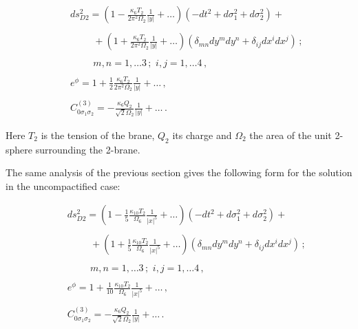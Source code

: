 \documentclass[12pt,a4paper]{article}
\begin{document}
\begin{eqnarray}
\label{D2}
&&ds_{D2}^2=(1-\frac{\kappa_6T_2}{2\pi^2\Omega_2}\frac{1}{|y|}
+\dots)(-dt^2+d\sigma_1^2+d\sigma_2^2)+\nonumber\\
&&\nonumber\\
&&\hspace{1cm}+(1+\frac{\kappa_6T_2}
{2\pi^2\Omega_2}\frac{1}{|y|}+\dots)\left(\delta_{mn}dy^m dy^n 
+\delta_{ij}dx^i dx^j\right) \, ;\nonumber\\
&&\nonumber\\
&&\hspace{1cm}m,n=1,\dots 3\, ;\,\, i,j=1,\dots 4\, ,\nonumber\\
& &\nonumber\\
&& e^\phi=1+\frac12\frac{\kappa_6 T_2}{2\pi^2\Omega_2}\frac{1}{|y|}
+\dots \, ,\nonumber\\
& &\nonumber\\
&& C^{(3)}_{0\sigma_1\sigma_2}=-\frac{\kappa_6 Q_2}
{\sqrt{2}\Omega_2}
\frac{1}{|y|}+\dots \, .
\end{eqnarray}

\noindent Here $T_2$ is the tension of the brane, $Q_2$ its charge and
$\Omega_2$ the area of the unit 2-sphere surrounding the 2-brane. 

The same analysis of the previous section gives the following form
for the solution in the uncompactified case:

\begin{eqnarray}
\label{D2unc}
&&ds_{D2}^2=(1-\frac15 \frac{\kappa_{10}T_2}{\Omega_6}\frac{1}{|x|^5}
+\dots)(-dt^2+d\sigma_1^2+d\sigma_2^2)+\nonumber\\
&&\nonumber\\
&&\hspace{1cm}+(1+\frac15 \frac{\kappa_{10}T_2}
{\Omega_6}\frac{1}{|x|^5}+\dots)\left(\delta_{mn}dy^m dy^n
+\delta_{ij}dx^i dx^j\right) \, ;\nonumber\\
&&\nonumber\\
&&\hspace{1cm}m,n=1,\dots 3\, ;\,\,i,j=1,\dots 4\, ,\nonumber\\
& &\nonumber\\
&& e^\phi=1+\frac{1}{10} \frac{\kappa_{10}T_2}{\Omega_6}\frac{1}{|x|^5}
+\dots \, ,\nonumber\\
& &\nonumber\\
&& C^{(3)}_{0\sigma_1\sigma_2}=-\frac{\kappa_6 Q_2}
{\sqrt{2}\Omega_2}
\frac{1}{|y|}+\dots \, .
\end{eqnarray}
\end{document}
